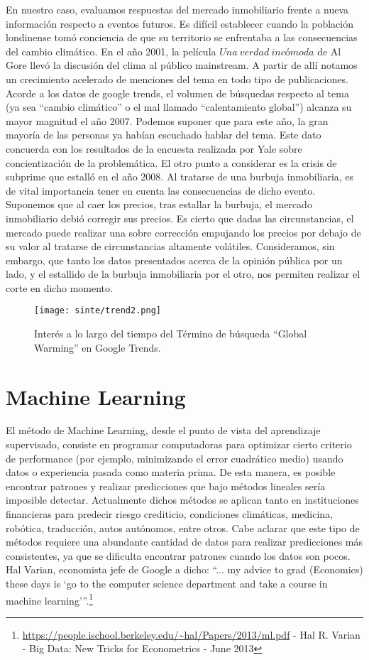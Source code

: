 \documentclass[12pt]{article}
\begin{document}
En nuestro caso, evaluamos respuestas del mercado inmobiliario frente a nueva información respecto a eventos futuros. Es difícil establecer cuando la población londinense tomó conciencia de que su territorio se enfrentaba a las consecuencias del cambio climático. En el año 2001, la película {$ Una \ verdad \ incómoda$} de Al Gore llevó la discusión del clima al público mainstream. A partir de allí notamos un crecimiento acelerado de menciones del tema en todo tipo de publicaciones. Acorde a los datos de google trends, el volumen de búsquedas respecto al tema (ya sea “cambio climático” o el mal llamado “calentamiento global”) alcanza su mayor magnitud el año 2007. Podemos suponer que para este año, la gran mayoría de las personas ya habían escuchado hablar del tema. Este dato concuerda con los resultados de la encuesta realizada por Yale sobre concientización de la problemática. 
El otro punto a considerar es la crisis de subprime que estalló en el año 2008. Al tratarse de una burbuja inmobiliaria, es de vital importancia tener en cuenta las consecuencias de dicho evento. Suponemos que al caer los precios, tras estallar la burbuja, el mercado inmobiliario debió corregir sus precios. Es cierto que dadas las circunstancias, el mercado puede realizar una sobre corrección empujando los precios por debajo de su valor al tratarse de circunstancias altamente volátiles. Consideramos, sin embargo, que tanto los datos presentados acerca de la opinión pública por un lado, y el estallido de la burbuja inmobiliaria por el otro, nos permiten realizar el corte en dicho momento.

\begin{figure}[H]
\centering
\texttt{[image: sinte/trend2.png]}
\caption*{Interés a lo largo del tiempo del Término de búsqueda “Global Warming” en Google Trends.}
\end{figure}
\pagebreak
\section{Machine Learning}
\label{sec:Machine Learning}

El método de Machine Learning, desde el punto de vista del aprendizaje supervisado, consiste en programar computadoras para optimizar cierto criterio de performance (por ejemplo, minimizando el error cuadrático medio) usando datos o experiencia pasada como materia prima. De esta manera, es posible encontrar patrones y realizar predicciones que bajo métodos lineales sería imposible detectar. Actualmente dichos métodos se aplican tanto en instituciones financieras para predecir riesgo crediticio, condiciones climáticas, medicina, robótica, traducción, autos autónomos, entre otros. Cabe aclarar que este tipo de métodos requiere una abundante cantidad de datos para realizar predicciones más consistentes, ya que se dificulta encontrar patrones cuando los datos son pocos. Hal Varian, economista jefe de Google a dicho: “... my advice to grad (Economics) these days is ‘go to the computer science department and take a course in machine learning’”.\footnote{\url{https://people.ischool.berkeley.edu/~hal/Papers/2013/ml.pdf} - Hal R. Varian - Big Data: New Tricks for Econometrics - June 2013
}
\end{document}
